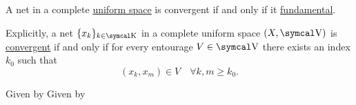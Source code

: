 \begin{Theorem}\label{thm:cauchys_net_convergence_criterion}
  A net in a complete \hyperref[def:complete_uniform_space]{uniform space} is convergent if and only if it \hyperref[def:fundamental_net]{fundamental}.

  Explicitly, a net \( \{ x_k \}_{k \in \CK} \) in a complete uniform space \( (X, \CV) \) is \hyperref[def:net_convergence/limit]{convergent} if and only if for every entourage \( V \in \CV \) there exists an index \( k_0 \) such that
  \begin{equation*}
    (x_k, x_m) \in V \quad\forall k, m \geq k_0.
  \end{equation*}
\end{Theorem}
\begin{RefListProof}
    \ISufficiency Given by 
    \INecessity Given by 
\end{RefListProof}

